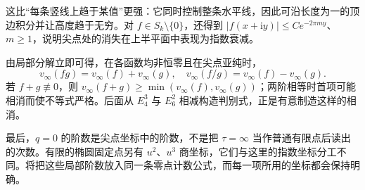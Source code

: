 这比“每条竖线上趋于某值”更强：它同时控制整条水平线，因此可沿长度为一的顶边积分并让高度趋于无穷。对 \(f\in S_k\setminus\{0\}\)，还得到 \(|f(x+\mathrm{i}y)|\le C e^{-2\pi m y}\)、\(m\ge1\)，说明尖点处的消失在上半平面中表现为指数衰减。

由局部分解立即可得，在各函数均非恒零且在尖点亚纯时，
\[
 v_\infty(fg)=v_\infty(f)+v_\infty(g),\quad
 v_\infty(f/g)=v_\infty(f)-v_\infty(g).
\]
若 \(f+g\not\equiv0\)，则 \(v_\infty(f+g)\ge\min(v_\infty(f),v_\infty(g))\)；两阶相等时首项可能相消而使不等式严格。后面从 \(E_4^3\) 与 \(E_6^2\) 相减构造判别式，正是有意制造这样的相消。

最后，\(q=0\) 的阶数是尖点坐标中的阶数，不是把 \(\tau=\infty\) 当作普通有限点后读出的次数。有限的椭圆固定点另有 \(u^2\)、\(u^3\) 商坐标，它们与这里的指数坐标分工不同。将把这些局部阶数放入同一条零点计数公式，而每一项所用的坐标都会保持明确。
